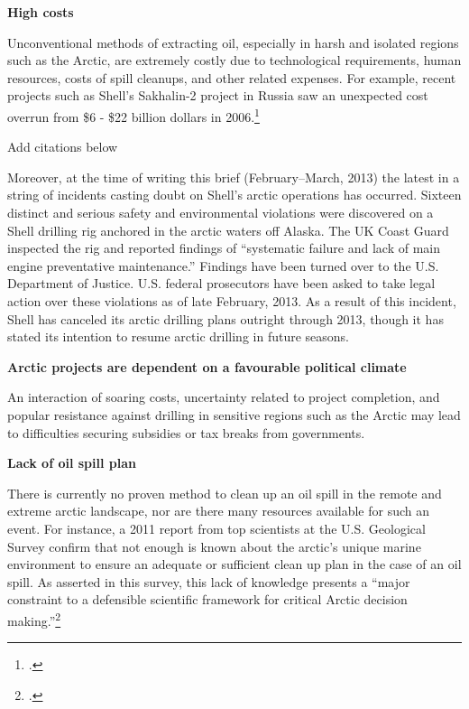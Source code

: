 \textbf{High costs} 

Unconventional methods of extracting oil, especially in harsh and isolated regions such as the Arctic, are extremely costly due to technological requirements, human resources, costs of spill cleanups, and other related expenses. 
For example, recent projects such as Shell's Sakhalin-2 project in Russia saw an unexpected cost overrun from \$6 - \$22 billion dollars in 2006.\footcite[For more on these four central risk factors see][]{OutInTheCold_2012}

\begin{vcom}
	Add citations below
\end{vcom}

Moreover, at the time of writing this brief (February--March, 2013) the latest in a string of incidents casting doubt on Shell's arctic operations has occurred. 
Sixteen distinct and serious safety and environmental violations were discovered on a Shell drilling rig anchored in the arctic waters off Alaska. 
The UK Coast Guard inspected the rig and reported findings of ``systematic failure and lack of main engine preventative maintenance.'' 
Findings have been turned over to the U.S. Department of Justice. U.S. federal prosecutors have been asked to take legal action over these violations as of late February, 2013. 
As a result of this incident, Shell has canceled its arctic drilling plans outright through 2013, though it has stated its intention to resume arctic drilling in future seasons.



\textbf{Arctic projects are dependent on a favourable political climate}



An interaction of soaring costs, uncertainty related to project completion, and popular resistance against drilling in sensitive regions such as the Arctic may lead to difficulties securing subsidies or tax breaks from governments.



\textbf{Lack of oil spill plan}



There is currently no proven method to clean up an oil spill in the remote and extreme arctic landscape, nor are there many resources available for such an event. 
For instance, a 2011 report from top scientists at the U.S. Geological Survey confirm that not enough is known about the arctic's unique marine environment to ensure an adequate or sufficient clean up plan in the case of an oil spill. 
As asserted in this survey, this lack of knowledge presents a ``major constraint to a defensible scientific framework for critical Arctic decision making.''\footcite[][]{Holland-BartelsPierce_2011}



